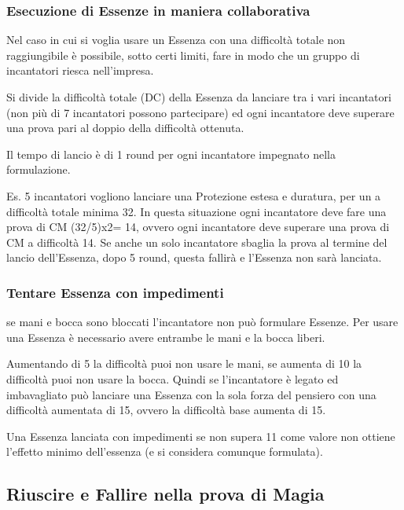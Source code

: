 \documentclass[a4paper,11pt,twoside,openany]{book}
\begin{document}
\subsubsection{Esecuzione di Essenze in maniera collaborativa}

Nel caso in cui si voglia usare un Essenza con una difficoltà totale non raggiungibile è possibile, sotto certi limiti, fare in modo che un gruppo di incantatori riesca nell'impresa.

Si divide la difficoltà totale (DC) della Essenza da lanciare tra i vari incantatori (non più di 7 incantatori possono partecipare) ed ogni incantatore deve superare una prova pari al doppio della difficoltà ottenuta.

Il tempo di lancio è di 1 round per ogni incantatore impegnato nella formulazione.

Es. 5 incantatori vogliono lanciare una Protezione estesa e duratura, per un a difficoltà totale minima 32. In questa situazione ogni incantatore deve fare una prova di CM (32/5)x2= 14, ovvero ogni incantatore deve superare una prova di CM a difficoltà 14. Se anche un solo incantatore sbaglia la prova al termine del lancio dell'Essenza, dopo 5 round, questa fallirà e l'Essenza non sarà lanciata.

\subsubsection{Tentare Essenza con impedimenti}

se mani e bocca sono bloccati l'incantatore non può formulare Essenze. Per usare una Essenza è necessario avere entrambe le mani e la bocca liberi.

Aumentando di 5 la difficoltà puoi non usare le mani, se aumenta di 10 la difficoltà puoi non usare la bocca. Quindi se l'incantatore è legato ed imbavagliato può lanciare una Essenza con la sola forza del pensiero con una difficoltà aumentata di 15, ovvero la difficoltà base aumenta di 15.

Una Essenza lanciata con impedimenti se non supera 11 come valore non ottiene l'effetto minimo dell'essenza (e si considera comunque formulata).

\subsection{Riuscire e Fallire nella prova di Magia}
\end{document}
